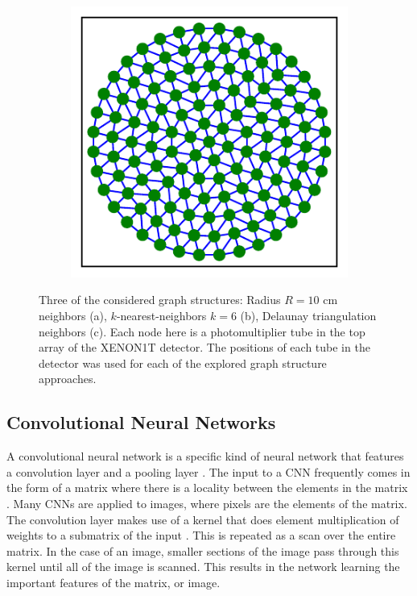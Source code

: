\documentclass[thesis.tex]{subfiles}
\begin{document}
\begin{figure}[t]
\begin{subfigure}{0.32\textwidth}
		\caption{}
	\end{subfigure}
	\begin{subfigure}{0.32\textwidth}
		\includegraphics[width=\textwidth]{figures/1T_delaunay-graph.pdf}
		\caption{}
	\end{subfigure}
	\caption{
	Three of the considered graph structures: Radius $R=10$ cm neighbors (a), $k$-nearest-neighbors $k=6$ (b), Delaunay triangulation neighbors (c).
	Each node here is a photomultiplier tube in the top array of the XENON1T detector.
	The positions of each tube in the detector was used for each of the explored graph structure approaches.
	}
	\label{fig:graph_structs}
\end{figure}
\subsection{Convolutional Neural Networks}\label{subsec:CNN}
A convolutional neural network is a specific kind of neural network that features a convolution layer and a pooling layer \cite{deep-learning}.
The input to a CNN frequently comes in the form of a matrix where there is a locality between the elements in the matrix \cite{deep-learning}.
Many CNNs are applied to images, where pixels are the elements of the matrix.
The convolution layer makes use of a kernel that does element multiplication of weights to a submatrix of the input \cite{deep-learning}.
This is repeated as a scan over the entire matrix.
In the case of an image, smaller sections of the image pass through this kernel until all of the image is scanned.
This results in the network learning the important features of the matrix, or image.
\end{document}
